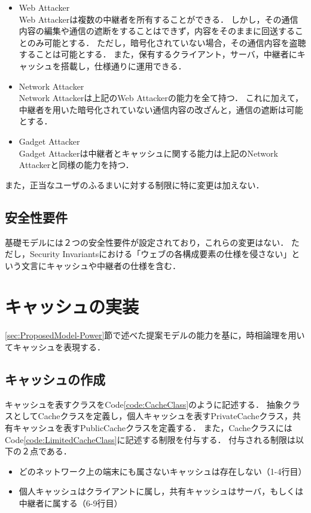 \documentclass[12pt,a4paper]{jbook}
\begin{document}
\begin{itemize}
\item Web Attacker\\
Web Attackerは複数の中継者を所有することができる．
しかし，その通信内容の編集や通信の遮断をすることはできず，内容をそのままに回送することのみ可能とする．
ただし，暗号化されていない場合，その通信内容を盗聴することは可能とする．
また，保有するクライアント，サーバ，中継者にキャッシュを搭載し，仕様通りに運用できる．
\item Network Attacker\\
Network Attackerは上記のWeb Attackerの能力を全て持つ．
これに加えて，中継者を用いた暗号化されていない通信内容の改ざんと，通信の遮断は可能とする．
\item Gadget Attacker\\
Gadget Attackerは中継者とキャッシュに関する能力は上記のNetwork Attackerと同様の能力を持つ．
\end{itemize}

また，正当なユーザのふるまいに対する制限に特に変更は加えない．

\subsection{安全性要件}
基礎モデルには２つの安全性要件が設定されており，これらの変更はない．
ただし，Security Invariantsにおける「ウェブの各構成要素の仕様を侵さない」という文言にキャッシュや中継者の仕様を含む．

\section{キャッシュの実装}
\ref{sec:ProposedModel-Power}節で述べた提案モデルの能力を基に，時相論理を用いてキャッシュを表現する．

\subsection{キャッシュの作成}
キャッシュを表すクラスをCode\ref{code:CacheClass}のように記述する．
抽象クラスとしてCacheクラスを定義し，個人キャッシュを表すPrivateCacheクラス，共有キャッシュを表すPublicCacheクラスを定義する．
また，CacheクラスにはCode\ref{code:LimitedCacheClass}に記述する制限を付与する．
付与される制限は以下の２点である．
\begin{itemize}
\item どのネットワーク上の端末にも属さないキャッシュは存在しない（1-4行目）
\item 個人キャッシュはクライアントに属し，共有キャッシュはサーバ，もしくは中継者に属する（6-9行目）
\end{itemize}
\end{document}
